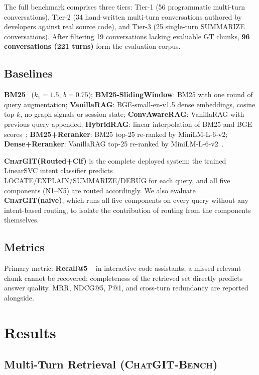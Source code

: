 \documentclass[conference]{IEEEtran}
\newcommand{\chatgit}{\textsc{ChatGIT}\xspace}
\newcommand{\conv}{\textsc{ChatGIT-Bench}\xspace}
\begin{document}
The full benchmark comprises three tiers: Tier-1 (56 programmatic
multi-turn conversations), Tier-2 (34 hand-written multi-turn
conversations authored by developers against real source code), and
Tier-3 (25 single-turn SUMMARIZE conversations). After filtering 19
conversations lacking evaluable GT chunks, \textbf{96 conversations
(221 turns)} form the evaluation corpus.

\subsection{Baselines}

\textbf{BM25}~\cite{robertson2009bm25} ($k_1{=}1.5$, $b{=}0.75$);
\textbf{BM25-SlidingWindow}: BM25 with one round of query augmentation;
\textbf{VanillaRAG}: BGE-small-en-v1.5 dense embeddings, cosine top-$k$,
no graph signals or session state;
\textbf{ConvAwareRAG}: VanillaRAG with previous query appended;
\textbf{HybridRAG}: linear interpolation of BM25 and BGE scores~\cite{karpukhin2020dense};
\textbf{BM25+Reranker}: BM25 top-25 re-ranked by MiniLM-L-6-v2;
\textbf{Dense+Reranker}: VanillaRAG top-25 re-ranked by MiniLM-L-6-v2~\cite{nogueira2019passage}.

\textbf{\chatgit (Routed+Clf)} is the complete deployed system: the trained
LinearSVC intent classifier predicts LOCATE/EXPLAIN/SUMMARIZE/DEBUG for
each query, and all five components (N1--N5) are routed accordingly.
We also evaluate \textbf{\chatgit (naive)}, which runs all five components
on every query without any intent-based routing, to isolate the contribution
of routing from the components themselves.

\subsection{Metrics}

Primary metric: \textbf{Recall@5} -- in interactive code assistants,
a missed relevant chunk cannot be recovered; completeness of the
retrieved set directly predicts answer quality. MRR, NDCG@5, P@1, and
cross-turn redundancy are reported alongside.

\FloatBarrier   %
\section{Results}
\label{sec:results}

\subsection{Multi-Turn Retrieval (\conv)}
\end{document}
